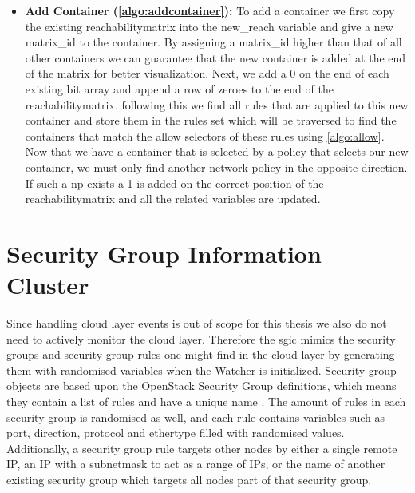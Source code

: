 \begin{itemize}
    \item \textbf{Add Container (\autoref{algo:addcontainer}):} To add a container we first copy the existing reachabilitymatrix into the new\_reach variable and give a new matrix\_id to the container. By assigning a matrix\_id higher than that of all other containers we can guarantee that the new container is added at the end of the matrix for better visualization. Next, we add a 0 on the end of each existing bit array and append a row of zeroes to the end of the reachabilitymatrix. following this we find all rules that are applied to this new container and store them in the rules set which will be traversed to find the containers that match the allow selectors of these rules using \autoref{algo:allow}. Now that we have a container that is selected by a policy that selects our new container, we must only find another network policy in the opposite direction. If such a \acrshort{np} exists a 1 is added on the correct position of the reachabilitymatrix and all the related variables are updated.
    
\end{itemize}






\newpage
\section{Security Group Information Cluster} \label{impl:sgic}
Since handling cloud layer events is out of scope for this thesis we also do not need to actively monitor the cloud layer. Therefore the \acrlong{sgic} mimics the security groups and security group rules one might find in the cloud layer by generating them with randomised variables when the Watcher is initialized. Security group objects are based upon the OpenStack Security Group definitions, which means they contain a list of rules and have a unique name \cite{secgroups}. The amount of rules in each security group is randomised as well, and each rule contains variables such as port, direction, protocol and ethertype filled with randomised values. Additionally, a security group rule targets other nodes by either a single remote IP, an IP with a subnetmask to act as a range of IPs, or the name of another existing security group which targets all nodes part of that security group.
\\[10pt]

